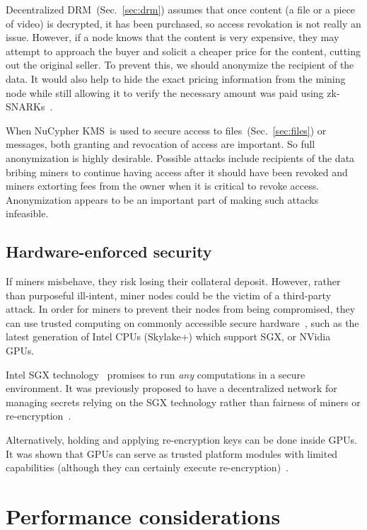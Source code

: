 \documentclass[longbibliography,nofootinbib]{revtex4-1}
\newcommand{\kms}{NuCypher KMS}
\begin{document}
Decentralized DRM~(Sec.~\ref{sec:drm}) assumes that once content (a file or a piece of video) is decrypted, it has been purchased,
so access revokation is not really an issue.
However, if a node knows that the content is very expensive, they may attempt to approach the buyer and solicit a cheaper price for the
content, cutting out the original seller.
To prevent this, we should anonymize the recipient of the data.
It would also help to hide the exact pricing information from the mining node while still allowing it to verify the necessary amount was paid using
zk-SNARKs~\cite{consensys-snarks}.

When \kms~is used to secure access to files~(Sec.~\ref{sec:files}) or messages, both granting and revocation of access are important.
So full anonymization is highly desirable.
Possible attacks include recipients of the data bribing miners to continue having access after it should have been revoked and
miners extorting fees from the owner when it is critical to revoke access.
Anonymization appears to be an important part of making such attacks infeasible.

\subsection{Hardware-enforced security}

If miners misbehave, they risk losing their collateral deposit.
However, rather than purposeful ill-intent, miner nodes could be the victim of a third-party attack.
In order for miners to prevent their nodes from being compromised, they can use trusted computing on commonly accessible secure hardware~\cite{Yang2011},
such as the latest generation of Intel CPUs (Skylake+) which support SGX, or NVidia GPUs.

Intel SGX technology~\cite{wiki:sgx} promises to run \emph{any} computations in a secure environment.
It was previously proposed to have a decentralized network for managing secrets relying on the SGX technology rather than fairness of
miners or re-encryption~\cite{sgx-blockchain-encryption}.

Alternatively, holding and applying re-encryption keys can be done inside GPUs.
It was shown that GPUs can serve as trusted platform modules with limited capabilities (although they can certainly execute
re-encryption)~\cite{gpu-trusted}.

\section{Performance considerations}
\end{document}
